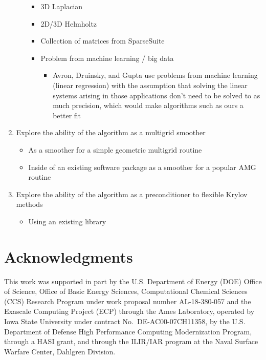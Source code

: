 \documentclass{article}
\theoremstyle{definition}
\theoremstyle{example}
\theoremstyle{example}
\theoremstyle{example}
\begin{document}
\begin{enumerate}
\begin{itemize}
\begin{itemize}
					\item 3D Laplacian
					\item 2D/3D Helmholtz
					\item Collection of matrices from SparseSuite
					\item Problem from machine learning / big data
						\begin{itemize}
							\item Avron, Druinsky, and Gupta use problems from machine learning (linear regression) with the assumption that solving the linear systems arising in those applications don't need to be solved to as much precision, which would make algorithms such as ours a better fit
						\end{itemize}
				\end{itemize}
		\end{itemize}
	\item Explore the ability of the algorithm as a multigrid smoother
		\begin{itemize}
			\item As a smoother for a simple geometric multigrid routine
			\item Inside of an existing software package as a smoother for a popular AMG routine
		\end{itemize}
	\item Explore the ability of the algorithm as a preconditioner to flexible Krylov methods
		\begin{itemize}
			\item Using an existing library
		\end{itemize}
\end{enumerate}

\section*{Acknowledgments}
This work was supported in part by the U.S. Department of Energy (DOE)  Office of Science, Office of Basic Energy Sciences, Computational Chemical Sciences (CCS) Research Program under work proposal number AL-18-380-057 and the Exascale Computing Project (ECP) through the Ames Laboratory, operated by Iowa State University under contract No.~DE-AC00-07CH11358, by the U.S. Department of Defense High Performance Computing Modernization Program, through a HASI grant, and through the ILIR/IAR program at the Naval Surface Warfare Center, Dahlgren Division. 




\end{document}
